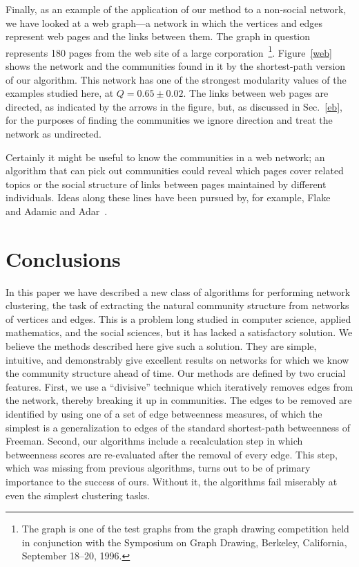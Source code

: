 \documentclass[twocolumn,pre,superscriptaddress]{revtex4}
\begin{document}
Finally, as an example of the application of our method to a non-social
network, we have looked at a web graph---a network in which the vertices
and edges represent web pages and the links between them.  The graph in
question represents 180 pages from the web site of a large
corporation~\footnote{The graph is one of the test graphs from the graph
drawing competition held in conjunction with the Symposium on Graph
Drawing, Berkeley, California, September 18--20, 1996.}.  Figure~\ref{web}
shows the network and the communities found in it by the shortest-path
version of our algorithm.  This network has one of the strongest modularity
values of the examples studied here, at $Q=0.65\pm0.02$.  The links between
web pages are directed, as indicated by the arrows in the figure, but, as
discussed in Sec.~\ref{eb}, for the purposes of finding the communities we
ignore direction and treat the network as undirected.

Certainly it might be useful to know the communities in a web network; an
algorithm that can pick out communities could reveal which pages cover
related topics or the social structure of links between pages maintained by
different individuals.  Ideas along these lines have been pursued by, for
example, Flake~\etal~\cite{FLGC02} and Adamic and Adar~\cite{AA01}.


\section{Conclusions}
\label{concs}
In this paper we have described a new class of algorithms for performing
network clustering, the task of extracting the natural community structure
from networks of vertices and edges.  This is a problem long studied in
computer science, applied mathematics, and the social sciences, but it has
lacked a satisfactory solution.  We believe the methods described here give
such a solution.  They are simple, intuitive, and demonstrably give
excellent results on networks for which we know the community structure
ahead of time.  Our methods are defined by two crucial features.  First, we
use a ``divisive'' technique which iteratively removes edges from the
network, thereby breaking it up in communities.  The edges to be removed
are identified by using one of a set of edge betweenness measures, of which
the simplest is a generalization to edges of the standard shortest-path
betweenness of Freeman.  Second, our algorithms include a recalculation
step in which betweenness scores are re-evaluated after the removal of
every edge.  This step, which was missing from previous algorithms, turns
out to be of primary importance to the success of ours.  Without it, the
algorithms fail miserably at even the simplest clustering tasks.
\end{document}
